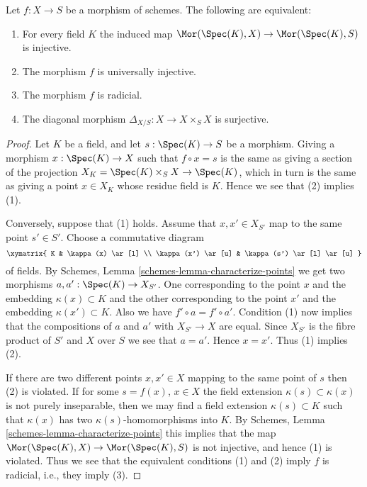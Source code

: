 \begin{lemma}
\label{lemma-universally-injective}
Let $f : X \to S$ be a morphism of schemes.
The following are equivalent:
\begin{enumerate}
\item For every field $K$ the induced map
$\Mor(\Spec(K), X) \to \Mor(\Spec(K), S)$
is injective.
\item The morphism $f$ is universally injective.
\item The morphism $f$ is radicial.
\item The diagonal morphism $\Delta_{X/S} : X \longrightarrow X \times_S X$
is surjective.
\end{enumerate}
\end{lemma}

\begin{proof}
Let $K$ be a field, and let $s : \Spec(K) \to S$ be a morphism.
Giving a morphism $x : \Spec(K) \to X$ such that $f \circ x = s$
is the same as giving a section of the projection
$X_K = \Spec(K) \times_S X \to \Spec(K)$, which in turn
is the same as giving a point $x \in X_K$ whose residue field is $K$.
Hence we see that (2) implies (1).

\medskip\noindent
Conversely, suppose that (1) holds. Assume that $x, x' \in X_{S'}$
map to the same point $s' \in S'$. Choose a commutative diagram
$$
\xymatrix{
K & \kappa(x) \ar[l] \\
\kappa(x') \ar[u] & \kappa(s') \ar[l] \ar[u]
}
$$
of fields. By Schemes, Lemma \ref{schemes-lemma-characterize-points}
we get two morphisms $a, a' : \Spec(K) \to X_{S'}$. One corresponding
to the point $x$ and the embedding $\kappa(x) \subset K$ and
the other corresponding to the  point $x'$ and the embedding
$\kappa(x') \subset K$. Also we have $f' \circ a = f' \circ a'$.
Condition (1) now implies that the compositions of $a$ and $a'$ with
$X_{S'} \to X$ are equal. Since $X_{S'}$ is the fibre product
of $S'$ and $X$ over $S$ we see that $a = a'$. Hence $x = x'$.
Thus (1) implies (2).

\medskip\noindent
If there are two different points $x, x' \in X$ mapping to the same point of $s$
then (2) is violated.
If for some $s = f(x)$, $x \in X$ the field extension
$\kappa(s) \subset \kappa(x)$ is not purely inseparable, then
we may find a field extension $\kappa(s) \subset K$ such that
$\kappa(x)$ has two $\kappa(s)$-homomorphisms into $K$. By
Schemes, Lemma \ref{schemes-lemma-characterize-points} this
implies that the map
$\Mor(\Spec(K), X) \to \Mor(\Spec(K), S)$
is not injective, and hence (1) is violated.
Thus we see that the equivalent conditions (1) and (2) imply
$f$ is radicial, i.e., they imply (3).


\end{proof}
